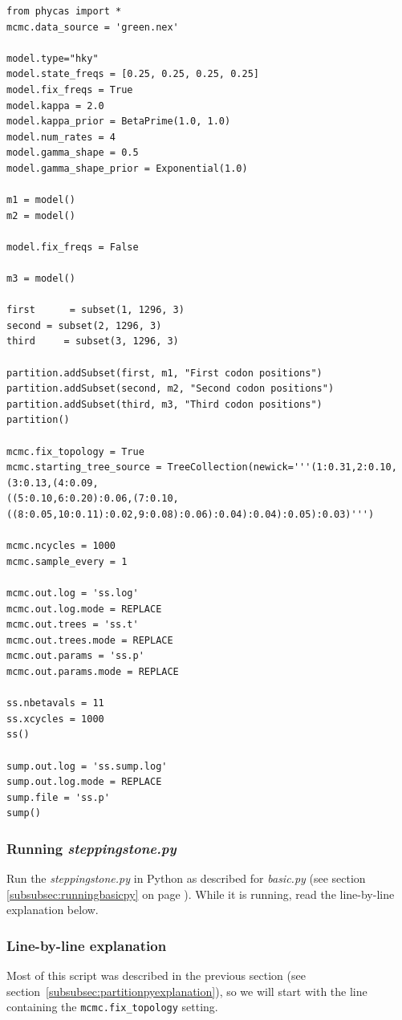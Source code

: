\documentclass[10pt]{article}
\newcommand{\pathname}[1]{{\em #1}}				%
\newcommand{\opt}[2]{{\tt \small #1.#2}\index{#1!#2}}	%
\begin{document}
\begin{verbatim}
from phycas import * 
mcmc.data_source = 'green.nex'
 
model.type="hky"
model.state_freqs = [0.25, 0.25, 0.25, 0.25]
model.fix_freqs = True
model.kappa = 2.0
model.kappa_prior = BetaPrime(1.0, 1.0)
model.num_rates = 4
model.gamma_shape = 0.5
model.gamma_shape_prior = Exponential(1.0)
 
m1 = model()
m2 = model()
 
model.fix_freqs = False
 
m3 = model()
 
first      = subset(1, 1296, 3)
second = subset(2, 1296, 3)
third     = subset(3, 1296, 3)
 
partition.addSubset(first, m1, "First codon positions")
partition.addSubset(second, m2, "Second codon positions")
partition.addSubset(third, m3, "Third codon positions")
partition()
 
mcmc.fix_topology = True
mcmc.starting_tree_source = TreeCollection(newick='''(1:0.31,2:0.10,(3:0.13,(4:0.09,
((5:0.10,6:0.20):0.06,(7:0.10,((8:0.05,10:0.11):0.02,9:0.08):0.06):0.04):0.04):0.05):0.03)''')
 
mcmc.ncycles = 1000
mcmc.sample_every = 1

mcmc.out.log = 'ss.log'
mcmc.out.log.mode = REPLACE
mcmc.out.trees = 'ss.t'
mcmc.out.trees.mode = REPLACE
mcmc.out.params = 'ss.p'
mcmc.out.params.mode = REPLACE

ss.nbetavals = 11
ss.xcycles = 1000
ss()

sump.out.log = 'ss.sump.log'
sump.out.log.mode = REPLACE
sump.file = 'ss.p'
sump()
\end{verbatim}

\subsubsection{Running \pathname{steppingstone.py}}
Run the \pathname{steppingstone.py} in Python as described for \pathname{basic.py} (see section \ref{subsubsec:runningbasicpy} on page \pageref{subsubsec:runningbasicpy}). While it is running, read the line-by-line explanation below.

\subsubsection{Line-by-line explanation}
Most of this script was described in the previous section (see section~\ref{subsubsec:partitionpyexplanation}), so we will start with the line containing the \opt{mcmc}{fix\_topology} setting.
\end{document}
